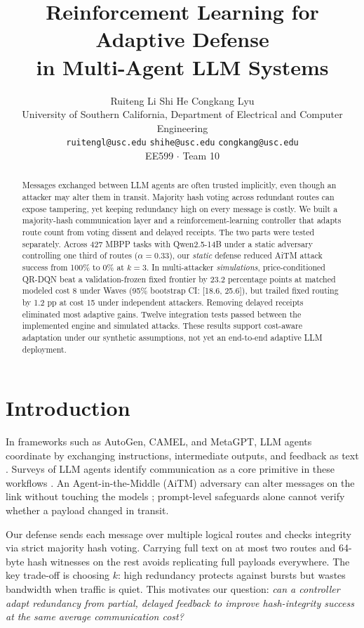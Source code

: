 \documentclass[10pt,twocolumn]{article}
\title{\vspace{-0.42in}\bfseries\fontsize{15}{17}\selectfont Reinforcement Learning for Adaptive Defense\\[-1pt]
 in Multi-Agent LLM Systems\vspace{-0.07in}}
\author{\normalsize Ruiteng Li \qquad Shi He \qquad Congkang Lyu\\[-1pt]
\small University of Southern California, Department of Electrical and Computer Engineering\\[-1pt]
\footnotesize \texttt{ruitengl@usc.edu} \quad \texttt{shihe@usc.edu} \quad \texttt{congkang@usc.edu}\\[-1pt]
\footnotesize EE599 $\cdot$ Team 10}
\date{}
\begin{document}
\maketitle
\vspace{-0.23in}
\begin{abstract}
\noindent
Messages exchanged between LLM agents are often trusted implicitly, even though an attacker may alter them in transit. Majority hash voting across redundant routes can expose tampering, yet keeping redundancy high on every message is costly. We built a majority-hash communication layer and a reinforcement-learning controller that adapts route count from voting dissent and delayed receipts. The two parts were tested separately. Across 427 MBPP tasks with Qwen2.5-14B under a static adversary controlling one third of routes ($\alpha=0.33$), our \emph{static} defense reduced AiTM attack success from 100\% to 0\% at $k=3$. In multi-attacker \emph{simulations}, price-conditioned QR-DQN beat a validation-frozen fixed frontier by 23.2 percentage points at matched modeled cost 8 under Waves (95\% bootstrap CI: [18.6, 25.6]), but trailed fixed routing by 1.2 pp at cost 15 under independent attackers. Removing delayed receipts eliminated most adaptive gains. Twelve integration tests passed between the implemented engine and simulated attacks. These results support cost-aware adaptation under our synthetic assumptions, not yet an end-to-end adaptive LLM deployment.
\end{abstract}
\vspace{-0.08in}

\section{Introduction}
In frameworks such as AutoGen, CAMEL, and MetaGPT, LLM agents coordinate by exchanging instructions, intermediate outputs, and feedback as text \citep{wu2024autogen,li2023camel,hong2024metagpt}. Surveys of LLM agents identify communication as a core primitive in these workflows \citep{wang2024survey,xi2023rise}. An Agent-in-the-Middle (AiTM) adversary can alter messages on the link without touching the models \citep{he2025aitm}; prompt-level safeguards alone cannot verify whether a payload changed in transit.

Our defense sends each message over multiple logical routes and checks integrity via strict majority hash voting. Carrying full text on at most two routes and 64-byte hash witnesses on the rest avoids replicating full payloads everywhere. The key trade-off is choosing $k$: high redundancy protects against bursts but wastes bandwidth when traffic is quiet. This motivates our question: \emph{can a controller adapt redundancy from partial, delayed feedback to improve hash-integrity success at the same average communication cost?}
\end{document}
